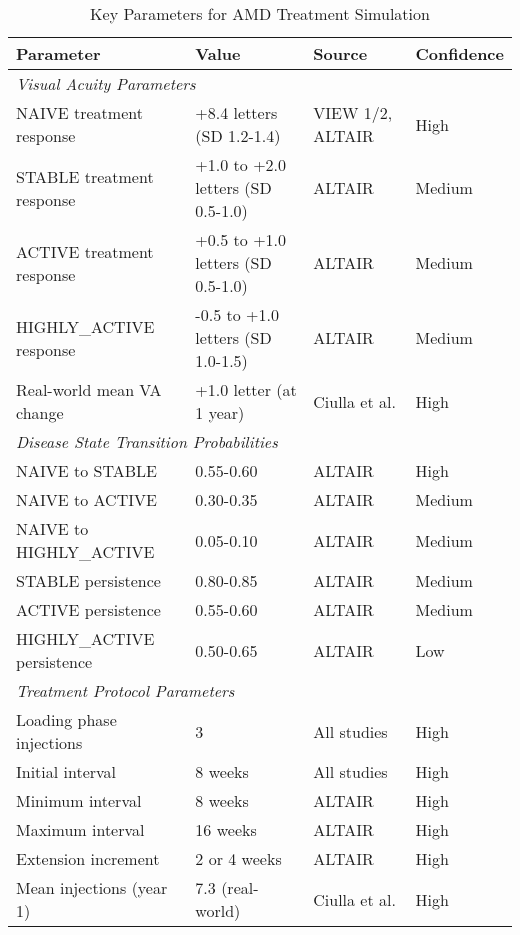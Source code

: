 \begin{table}[h]
\begin{threeparttable}
\caption{Key Parameters for AMD Treatment Simulation}
\label{tab:simulation_parameters}
\begin{tabular}{p{4.5cm}p{5cm}p{3.5cm}p{2cm}}
\hline
\textbf{Parameter} & \textbf{Value} & \textbf{Source} & \textbf{Confidence} \\
\hline
\multicolumn{4}{l}{\textit{Visual Acuity Parameters}} \\
\hline
NAIVE treatment response & +8.4 letters (SD 1.2-1.4) & VIEW 1/2\tnote{1}, ALTAIR\tnote{2} & High \\
STABLE treatment response & +1.0 to +2.0 letters (SD 0.5-1.0) & ALTAIR\tnote{2} & Medium \\
ACTIVE treatment response & +0.5 to +1.0 letters (SD 0.5-1.0) & ALTAIR\tnote{2} & Medium \\
HIGHLY\_ACTIVE response & -0.5 to +1.0 letters (SD 1.0-1.5) & ALTAIR\tnote{2} & Medium \\
Real-world mean VA change & +1.0 letter (at 1 year) & Ciulla et al.\tnote{3} & High \\
\hline
\multicolumn{4}{l}{\textit{Disease State Transition Probabilities}} \\
\hline
NAIVE to STABLE & 0.55-0.60 & ALTAIR\tnote{2} & High \\
NAIVE to ACTIVE & 0.30-0.35 & ALTAIR\tnote{2} & Medium \\
NAIVE to HIGHLY\_ACTIVE & 0.05-0.10 & ALTAIR\tnote{2} & Medium \\
STABLE persistence & 0.80-0.85 & ALTAIR\tnote{2} & Medium \\
ACTIVE persistence & 0.55-0.60 & ALTAIR\tnote{2} & Medium \\
HIGHLY\_ACTIVE persistence & 0.50-0.65 & ALTAIR\tnote{2} & Low \\
\hline
\multicolumn{4}{l}{\textit{Treatment Protocol Parameters}} \\
\hline
Loading phase injections & 3 & All studies & High \\
Initial interval & 8 weeks & All studies & High \\
Minimum interval & 8 weeks & ALTAIR\tnote{2} & High \\
Maximum interval & 16 weeks & ALTAIR\tnote{2} & High \\
Extension increment & 2 or 4 weeks & ALTAIR\tnote{2} & High \\
Mean injections (year 1) & 7.3 (real-world) & Ciulla et al.\tnote{3} & High \\

\end{tabular}
\end{threeparttable}
\end{table}
